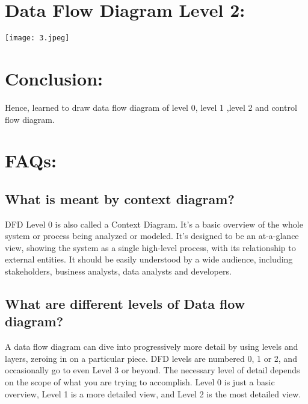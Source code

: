 \documentclass[16pt]{article}
\begin{document}
\section{\textbf{Data Flow Diagram Level 2:}}

\begin{center}
    \texttt{[image: 3.jpeg]}
\end{center}

\section{\textbf{Conclusion:}}
Hence, learned to draw data flow diagram of level 0, level 1 ,level 2 and control flow diagram.

\section{\textbf{FAQs:}}
\subsection{\textbf{What is meant by context diagram?}}
DFD Level 0 is also called a Context Diagram. It’s a basic overview of the whole system or
process being analyzed or modeled. It’s designed to be an at-a-glance view, showing the system
as a single high-level process, with its relationship to external entities. It should be easily
understood by a wide audience, including stakeholders, business analysts, data analysts and
developers.

\subsection{\textbf{What are different levels of Data flow diagram?}}
A data flow diagram can dive into progressively more detail by using levels and layers, zeroing
in on a particular piece. DFD levels are numbered 0, 1 or 2, and occasionally go to even Level
3 or beyond. The necessary level of detail depends on the scope of what you are trying to accomplish. Level 0 is just a basic overview, Level 1 is a more detailed view, and Level 2 is the
most detailed view.
\end{document}
